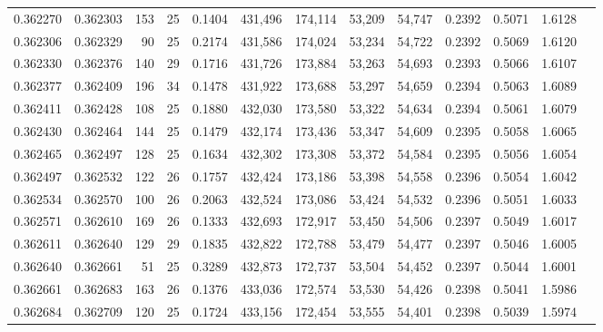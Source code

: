 \begin{tabular}{rrrrrrrrrrrrr}
0.362270 & 0.362303 &   153 &  25 &                                     0.1404 & 431,496 & 174,114 &  53,209 &  54,747 & 0.2392 & 0.5071 & 1.6128 \\
0.362306 & 0.362329 &    90 &  25 &                                     0.2174 & 431,586 & 174,024 &  53,234 &  54,722 & 0.2392 & 0.5069 & 1.6120 \\
0.362330 & 0.362376 &   140 &  29 &                                     0.1716 & 431,726 & 173,884 &  53,263 &  54,693 & 0.2393 & 0.5066 & 1.6107 \\
0.362377 & 0.362409 &   196 &  34 &                                     0.1478 & 431,922 & 173,688 &  53,297 &  54,659 & 0.2394 & 0.5063 & 1.6089 \\
0.362411 & 0.362428 &   108 &  25 &                                     0.1880 & 432,030 & 173,580 &  53,322 &  54,634 & 0.2394 & 0.5061 & 1.6079 \\
0.362430 & 0.362464 &   144 &  25 &                                     0.1479 & 432,174 & 173,436 &  53,347 &  54,609 & 0.2395 & 0.5058 & 1.6065 \\
0.362465 & 0.362497 &   128 &  25 &                                     0.1634 & 432,302 & 173,308 &  53,372 &  54,584 & 0.2395 & 0.5056 & 1.6054 \\
0.362497 & 0.362532 &   122 &  26 &                                     0.1757 & 432,424 & 173,186 &  53,398 &  54,558 & 0.2396 & 0.5054 & 1.6042 \\
0.362534 & 0.362570 &   100 &  26 &                                     0.2063 & 432,524 & 173,086 &  53,424 &  54,532 & 0.2396 & 0.5051 & 1.6033 \\
0.362571 & 0.362610 &   169 &  26 &                                     0.1333 & 432,693 & 172,917 &  53,450 &  54,506 & 0.2397 & 0.5049 & 1.6017 \\
0.362611 & 0.362640 &   129 &  29 &                                     0.1835 & 432,822 & 172,788 &  53,479 &  54,477 & 0.2397 & 0.5046 & 1.6005 \\
0.362640 & 0.362661 &    51 &  25 &                                     0.3289 & 432,873 & 172,737 &  53,504 &  54,452 & 0.2397 & 0.5044 & 1.6001 \\
0.362661 & 0.362683 &   163 &  26 &                                     0.1376 & 433,036 & 172,574 &  53,530 &  54,426 & 0.2398 & 0.5041 & 1.5986 \\
0.362684 & 0.362709 &   120 &  25 &                                     0.1724 & 433,156 & 172,454 &  53,555 &  54,401 & 0.2398 & 0.5039 & 1.5974 \\

\end{tabular}
